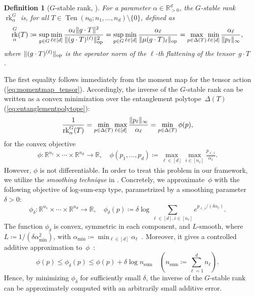 \documentclass[11pt,letterpaper]{article}
\newtheorem{definition}[theorem]{Definition}\AddToHook{env/definition/begin}{\crefalias{theorem}{definition}}
\numberwithin{equation}{section}
\newcommand{\RR}{\mathbb{R}}
\DeclareMathOperator{\rk}{rk}
\DeclareMathOperator{\ope}{op}
\DeclareMathOperator{\Ten}{Ten}
\DeclareMathOperator{\Sum}{sum}
\DeclarePairedDelimiter\norm{\lVert}{\rVert}
\begin{document}
\begin{definition}[{$G$-stable rank, \cite{Derksen-22}}]
For a parameter $\alpha \in \RR_{>0}^d$, the $G$-stable rank~$\rk_{\alpha}^G$ is, for all $T \in \Ten(n_0; n_1, \ldots, n_d)\setminus\{0\}$, defined as
\[
    \rk_{\alpha}^G(T)
\coloneqq \sup_{g \in G} \min_{\ell\in[d]} \frac {\alpha_\ell \norm{g \cdot T}^2} {\norm{(g \cdot T)^{(\ell)}}_{\ope}^2}
= \sup_{g \in G} \min_{\ell\in[d]} \frac {\alpha_\ell} {\norm{\mu(g \cdot T)_\ell}_{\ope}}
= \max_{p \in \Delta(T)} \min_{\ell\in[d]} \frac {\alpha_\ell} {\norm{p_\ell}_\infty},
\]
where $\norm{(g \cdot T)^{(\ell)}}_{\ope}$ is the operator norm of the $\ell$-th flattening of the tensor~$g \cdot T$.
\end{definition}

\noindent
The first equality follows immediately from the moment map for the tensor action (\cref{eq:momentmap_tensor}).
Accordingly, the inverse of the $G$-stable rank can be written as a convex minimization over the entanglement polytope~$\Delta(T)$ (\cref{eq:entanglementpolytope}): %
\begin{align}\label{eq:Gstable-rank}
    \frac 1 {\rk_{\alpha}^G(T)} = \min_{p \in \Delta(T)} \max_{\ell\in[d]} \frac {\norm{p_\ell}_\infty} {\alpha_\ell} = \min_{p\in\Delta(T)} \phi(p),
\end{align}
for the convex objective
\begin{align*}
    \phi \colon \RR^{n_1} \times \cdots \times \RR^{n_d} \to \RR, \quad \phi(p_1,\dots,p_d) \coloneqq \max_{\ell\in[d]} \max_{i\in[n_\ell]} \frac {p_{\ell,i}} {\alpha_\ell}.
\end{align*}
However, $\phi$ is not differentiable.
In order to treat this problem in our framework, we utilize the \emph{smoothing technique} in \cite[\S{}4]{Nesterov-smoothing}.
Concretely, we approximate~$\phi$ with the following objective of log-sum-exp type, parametrized by a smoothing parameter~$\delta > 0$:
\[
    \phi_\delta \colon \RR^{n_1} \times \cdots \times \RR^{n_d} \to \RR, \quad \phi_\delta(p) \coloneqq \delta\log\sum_{\ell \in [d], i \in [n_\ell]}e^{p_{\ell, i}/(\delta \alpha_\ell)}.
\]
The function $\phi_\delta$ is convex, symmetric in each component, and $L$-smooth, where~$L \coloneq 1/(\delta\alpha_{\min}^2)$, with $\alpha_{\min} \coloneqq \min_{\ell \in [d]}\alpha_\ell$~\cite[Lem~3.10]{BLNW2020}.
Moreover, it gives a controlled additive approximation to~$\phi$~\cite[(17)]{Nesterov-smoothing}:
\begin{equation}\label{eq:nesterov guarantee}
    \phi(p) \le \phi_\delta(p) \le \phi(p) + \delta\log n_{\Sum}
    \quad (n_{\Sum} \coloneqq \sum_{\ell=1}^d n_\ell).
\end{equation}
Hence, by minimizing $\phi_\delta$ for sufficiently small $\delta$, the inverse of the $G$-stable rank can be approximately computed with an arbitrarily small additive error.
\end{document}
